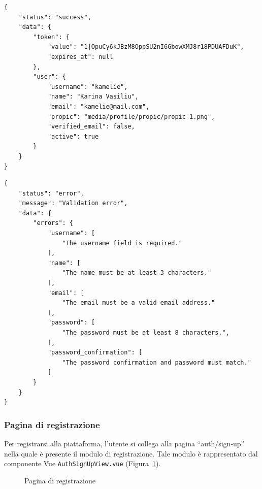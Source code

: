 \begin{lstlisting}[caption={Risposta di successo registrazione}, label={lst:response_registration_success}, tabsize=3]
{
	"status": "success",
	"data": {
		"token": {
			"value": "1|OpuCy6kJBzM8OppSU2nI6GbowXMJ8r18PDUAFDuK",
			"expires_at": null
		},
		"user": {
			"username": "kamelie",
			"name": "Karina Vasiliu",
			"email": "kamelie@mail.com",
			"propic": "media/profile/propic/propic-1.png",
			"verified_email": false,
			"active": true
		}
	}
}
\end{lstlisting}

\begin{lstlisting}[caption={Risposta di errore registrazione}, label={lst:response_registration_error}, tabsize=3]
{
	"status": "error",
	"message": "Validation error",
	"data": {
		"errors": {
			"username": [
				"The username field is required."
			],
			"name": [
				"The name must be at least 3 characters."
			],
			"email": [
				"The email must be a valid email address."
			],
			"password": [
				"The password must be at least 8 characters.",
			],
			"password_confirmation": [
				"The password confirmation and password must match."
			]
		}
	}
}
\end{lstlisting}

\subsubsection{Pagina di registrazione}
Per registrarsi alla piattaforma, l'utente si collega alla pagina ``auth/sign-up'' nella quale \`e presente il modulo di registrazione. Tale modulo \`e rappresentato dal componente Vue \verb|AuthSignUpView.vue| (Figura~\ref{fig:modulo_registrazione}).

\begin{figure}[htbp]
	\centering
	\fboxsep=0.5pt
	\fboxrule=0.5pt
	\caption{Pagina di registrazione}
	\label{fig:modulo_registrazione}
\end{figure}

